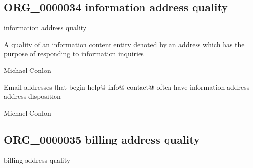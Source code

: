 \documentclass[letterpaper,10pt,english]{sphinxmanual}
\begin{document}
\subsection{ORG\_0000034 \sphinxhyphen{} information address quality}
\label{\detokenize{doc-ORG_0000034:org-0000034-information-address-quality}}\label{\detokenize{doc-ORG_0000034:index-0}}\label{\detokenize{doc-ORG_0000034::doc}}
\begin{sphinxShadowBox}

\sphinxAtStartPar
information address quality
\end{sphinxShadowBox}

\begin{sphinxShadowBox}

\sphinxAtStartPar
A quality of an information content entity denoted by an address which has the purpose of responding to information inquiries
\end{sphinxShadowBox}

\begin{sphinxShadowBox}

\sphinxAtStartPar
Michael Conlon 
\end{sphinxShadowBox}

\begin{sphinxShadowBox}

\sphinxAtStartPar
Email addresses that begin help@ info@ contact@ often have information address address disposition
\end{sphinxShadowBox}

\begin{sphinxShadowBox}

\sphinxAtStartPar
Michael Conlon 
\end{sphinxShadowBox}
\begin{quote}

\ignorespaces \end{quote}


\subsection{ORG\_0000035 \sphinxhyphen{} billing address quality}
\label{\detokenize{doc-ORG_0000035:org-0000035-billing-address-quality}}\label{\detokenize{doc-ORG_0000035:index-0}}\label{\detokenize{doc-ORG_0000035::doc}}
\begin{sphinxShadowBox}

\sphinxAtStartPar
billing address quality
\end{sphinxShadowBox}
\end{document}
